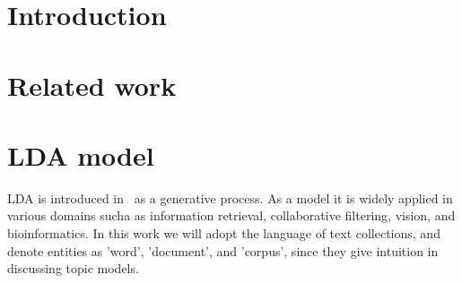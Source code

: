 \documentclass{article}
\begin{document}
\begin{abstract}


\end{abstract}

\section{Introduction} \label{sec:intro}


\section{Related work}

\section{LDA model} \label{sec:ldamodel}
LDA is introduced in~\cite{Blei2003a} as a generative process. As a model it is widely applied in various domains sucha as information retrieval, collaborative filtering, vision, and bioinformatics. In this work we will adopt the language of text collections, and denote entities as 'word', 'document', and 'corpus', since they give intuition in discussing topic models.  
\end{document}
